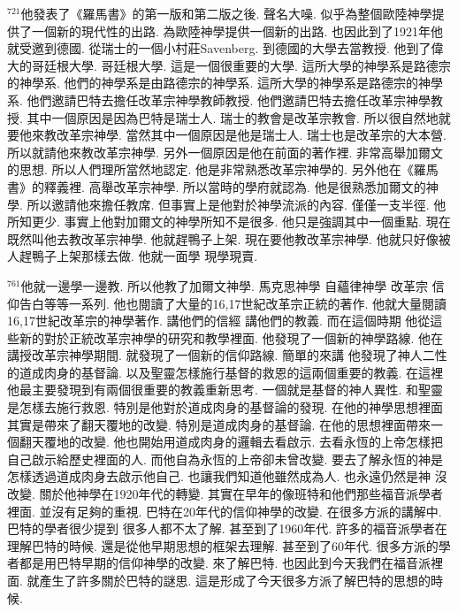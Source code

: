 \documentclass{book}
\begin{document}
$^{721}$他發表了《羅馬書》的第一版和第二版之後.
聲名大噪.
似乎為整個歐陸神學提供了一個新的現代性的出路.
為歐陸神學提供一個新的出路.
也因此到了1921年他就受邀到德國.
從瑞士的一個小村莊Savenberg.
到德國的大學去當教授.
他到了偉大的哥廷根大學.
哥廷根大學.
這是一個很重要的大學.
這所大學的神學系是路德宗的神學系.
他們的神學系是由路德宗的神學系.
這所大學的神學系是路德宗的神學系.
他們邀請巴特去擔任改革宗神學教師教授.
他們邀請巴特去擔任改革宗神學教授.
其中一個原因是因為巴特是瑞士人.
瑞士的教會是改革宗教會.
所以很自然地就要他來教改革宗神學.
當然其中一個原因是他是瑞士人.
瑞士也是改革宗的大本營.
所以就請他來教改革宗神學.
另外一個原因是他在前面的著作裡.
非常高舉加爾文的思想.
所以人們理所當然地認定.
他是非常熟悉改革宗神學的.
另外他在《羅馬書》的釋義裡.
高舉改革宗神學.
所以當時的學府就認為.
他是很熟悉加爾文的神學.
所以邀請他來擔任教席.
但事實上是他對於神學流派的內容.
僅僅一支半徑.
他所知更少.
事實上他對加爾文的神學所知不是很多.
他只是強調其中一個重點.
現在既然叫他去教改革宗神學.
他就趕鴨子上架.
現在要他教改革宗神學.
他就只好像被人趕鴨子上架那樣去做.
他就一面學 現學現賣.

$^{761}$他就一邊學一邊教.
所以他教了加爾文神學.
馬克思神學 自蘊律神學 改革宗 信仰告白等等一系列.
他也閱讀了大量的16,17世紀改革宗正統的著作.
他就大量閱讀16,17世紀改革宗的神學著作.
講他們的信經 講他們的教義.
而在這個時期 他從這些新的對於正統改革宗神學的研究和教學裡面.
他發現了一個新的神學路線.
他在講授改革宗神學期間.
就發現了一個新的信仰路線.
簡單的來講 他發現了神人二性的道成肉身的基督論.
以及聖靈怎樣施行基督的救恩的這兩個重要的教義.
在這裡他最主要發現到有兩個很重要的教義重新思考.
一個就是基督的神人異性.
和聖靈是怎樣去施行救恩.
特別是他對於道成肉身的基督論的發現.
在他的神學思想裡面其實是帶來了翻天覆地的改變.
特別是道成肉身的基督論.
在他的思想裡面帶來一個翻天覆地的改變.
他也開始用道成肉身的邏輯去看啟示.
去看永恆的上帝怎樣把自己啟示給歷史裡面的人.
而他自為永恆的上帝卻未曾改變.
要去了解永恆的神是怎樣透過道成肉身去啟示他自己.
也讓我們知道他雖然成為人.
也永遠仍然是神 沒改變.
關於他神學在1920年代的轉變.
其實在早年的像班特和他們那些福音派學者裡面.
並沒有足夠的重視.
巴特在20年代的信仰神學的改變.
在很多方派的講解中.
巴特的學者很少提到 很多人都不太了解.
甚至到了1960年代.
許多的福音派學者在理解巴特的時候.
還是從他早期思想的框架去理解.
甚至到了60年代.
很多方派的學者都是用巴特早期的信仰神學的改變.
來了解巴特.
也因此到今天我們在福音派裡面.
就產生了許多關於巴特的謎思.
這是形成了今天很多方派了解巴特的思想的時候.
\end{document}
